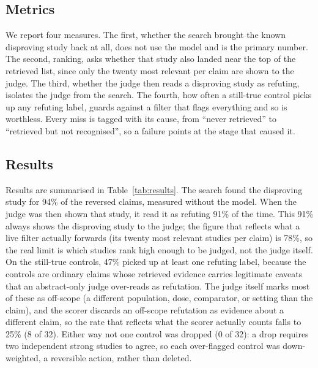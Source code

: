 \documentclass[11pt,a4paper]{article}
\begin{document}
\subsection{Metrics}

We report four measures. The first, whether the search brought the known disproving study back at all, does not use the model and is the primary number. The second, ranking, asks whether that study also landed near the top of the retrieved list, since only the twenty most relevant per claim are shown to the judge. The third, whether the judge then reads a disproving study as refuting, isolates the judge from the search. The fourth, how often a still-true control picks up any refuting label, guards against a filter that flags everything and so is worthless. Every miss is tagged with its cause, from ``never retrieved'' to ``retrieved but not recognised'', so a failure points at the stage that caused it.

\subsection{Results}

Results are summarised in Table~\ref{tab:results}. The search found the disproving study for 94\% of the reversed claims, measured without the model. When the judge was then shown that study, it read it as refuting 91\% of the time. This 91\% always shows the disproving study to the judge; the figure that reflects what a live filter actually forwards (its twenty most relevant studies per claim) is 78\%, so the real limit is which studies rank high enough to be judged, not the judge itself. On the still-true controls, 47\% picked up at least one refuting label, because the controls are ordinary claims whose retrieved evidence carries legitimate caveats that an abstract-only judge over-reads as refutation. The judge itself marks most of these as off-scope (a different population, dose, comparator, or setting than the claim), and the scorer discards an off-scope refutation as evidence about a different claim, so the rate that reflects what the scorer actually counts falls to 25\% (8 of 32). Either way not one control was dropped (0 of 32): a drop requires two independent strong studies to agree, so each over-flagged control was down-weighted, a reversible action, rather than deleted.
\end{document}
